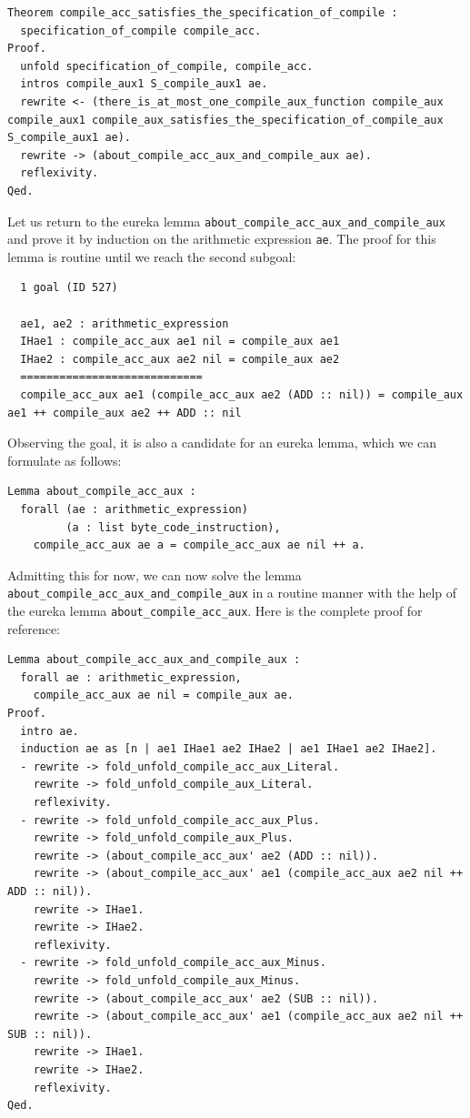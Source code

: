 \documentclass{article}
\begin{document}
\begin{lstlisting}
Theorem compile_acc_satisfies_the_specification_of_compile :
  specification_of_compile compile_acc.
Proof.
  unfold specification_of_compile, compile_acc.
  intros compile_aux1 S_compile_aux1 ae.
  rewrite <- (there_is_at_most_one_compile_aux_function compile_aux compile_aux1 compile_aux_satisfies_the_specification_of_compile_aux S_compile_aux1 ae).
  rewrite -> (about_compile_acc_aux_and_compile_aux ae).
  reflexivity.
Qed.
\end{lstlisting}

Let us return to the eureka lemma \texttt{about\_compile\_acc\_aux\_and\_compile\_aux} and prove it by induction on the arithmetic expression \texttt{ae}. The proof for this lemma is routine until we reach the second subgoal:

\begin{lstlisting}
  1 goal (ID 527)
  
  ae1, ae2 : arithmetic_expression
  IHae1 : compile_acc_aux ae1 nil = compile_aux ae1
  IHae2 : compile_acc_aux ae2 nil = compile_aux ae2
  ============================
  compile_acc_aux ae1 (compile_acc_aux ae2 (ADD :: nil)) = compile_aux ae1 ++ compile_aux ae2 ++ ADD :: nil
\end{lstlisting}

Observing the goal, it is also a candidate for an eureka lemma, which we can formulate as follows:

\begin{lstlisting}
Lemma about_compile_acc_aux :
  forall (ae : arithmetic_expression)
         (a : list byte_code_instruction),
    compile_acc_aux ae a = compile_acc_aux ae nil ++ a.
\end{lstlisting}

Admitting this for now, we can now solve the lemma \texttt{about\_compile\_acc\_aux\_and\_compile\_aux} in a routine manner with the help of the eureka lemma \texttt{about\_compile\_acc\_aux}. Here is the complete proof for reference:

\begin{lstlisting}
Lemma about_compile_acc_aux_and_compile_aux :
  forall ae : arithmetic_expression,
    compile_acc_aux ae nil = compile_aux ae.
Proof.
  intro ae.
  induction ae as [n | ae1 IHae1 ae2 IHae2 | ae1 IHae1 ae2 IHae2].
  - rewrite -> fold_unfold_compile_acc_aux_Literal.
    rewrite -> fold_unfold_compile_aux_Literal.
    reflexivity.
  - rewrite -> fold_unfold_compile_acc_aux_Plus.
    rewrite -> fold_unfold_compile_aux_Plus.
    rewrite -> (about_compile_acc_aux' ae2 (ADD :: nil)).
    rewrite -> (about_compile_acc_aux' ae1 (compile_acc_aux ae2 nil ++ ADD :: nil)).
    rewrite -> IHae1.
    rewrite -> IHae2.
    reflexivity.
  - rewrite -> fold_unfold_compile_acc_aux_Minus.
    rewrite -> fold_unfold_compile_aux_Minus.
    rewrite -> (about_compile_acc_aux' ae2 (SUB :: nil)).
    rewrite -> (about_compile_acc_aux' ae1 (compile_acc_aux ae2 nil ++ SUB :: nil)).
    rewrite -> IHae1.
    rewrite -> IHae2.
    reflexivity.
Qed.
\end{lstlisting}
\end{document}
